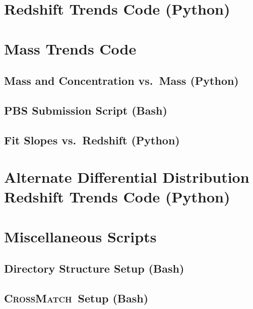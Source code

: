 \documentclass[12pt]{report}
\newcommand{\crossmatch}{\textsc{CrossMatch}}
\begin{document}
\begin{appendices}
	\chapter{Redshift Trends Code (Python)}
	\label{app:redshift_trends}
	

	\chapter{Mass Trends Code}
	\label{app:mass_trends}
	\section{Mass and Concentration vs.\ Mass (Python)}
	\label{app:mass_trends_mass}
	
	\section{PBS Submission Script (Bash)}
	\label{app:run_mass_trends}
	
	\section{Fit Slopes vs.\ Redshift (Python)}
	\label{app:mass_trends_redshift}
	

	\chapter{Alternate Differential Distribution Redshift Trends Code (Python)}
	\label{app:alt_redshift_trends}
	

	\chapter{Miscellaneous Scripts}
	\label{app:misc_scripts}
	\section{Directory Structure Setup (Bash)}
	\label{app:setup}
	
	\section{\crossmatch\ Setup (Bash)}
	\label{app:crossmatch_setup}
	

\end{appendices}
\end{document}
